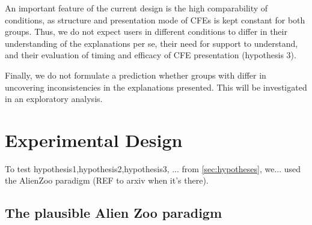 An important feature of the current design is the high comparability of conditions, as structure and presentation mode of \glspl{CFE} is kept constant for both groups.
Thus, we do not expect users in different conditions to differ in their understanding of the explanations per se, their need for support to understand, and their evaluation of timing and efficacy of \gls{CFE} presentation (hypothesis 3).

Finally, we do not formulate a prediction whether groups with differ in uncovering inconsistencies in the explanations presented. This will be investigated in an exploratory analysis.%

\section{Experimental Design}\label{sec:experimental-design}
\textcolor{ACMDarkBlue}{
To test hypothesis1,hypothesis2,hypothesis3, ... from \ref{sec:hypotheses}, we... used the AlienZoo paradigm (REF to arxiv when it's there). 
}

\subsection{The plausible Alien Zoo paradigm}


